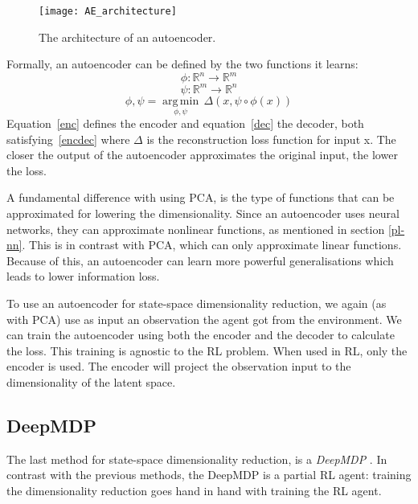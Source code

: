 \begin{figure}[h]
    \centering
    \texttt{[image: AE\_architecture]}
    \caption{The architecture of an autoencoder.}
    \label{fig:AE_architecture}
\end{figure}

Formally, an autoencoder can be defined by the two functions it learns: 
\begin{equation}
  \label{enc}
  \phi :{\mathbb{R}^n}\rightarrow {\mathbb{R}^m}
\end{equation}
\begin{equation}
  \label{dec}
  \psi :{\mathbb{R}^m}\rightarrow {\mathbb{R}^n}
\end{equation}
\begin{equation}
  \label{encdec}
  \phi ,\psi ={\underset {\phi ,\psi }{\operatorname {arg\,min} }}\,{\Delta}(x, \psi \circ \phi (x))
\end{equation}
Equation~\eqref{enc} defines the encoder and equation~\eqref{dec} the decoder, both satisfying~\eqref{encdec} where $\Delta$ is the reconstruction loss function for input x. The closer the output of the autoencoder approximates the original input, the lower the loss.

A fundamental difference with using PCA, is the type of functions that can be approximated for lowering the dimensionality. Since an autoencoder uses neural networks, they can approximate nonlinear functions, as mentioned in section \ref{pl-nn}. This is in contrast with PCA, which can only approximate linear functions. Because of this, an autoencoder can learn more powerful generalisations which leads to lower information loss\cite{AE_general}.

To use an autoencoder for state-space dimensionality reduction, we again (as with PCA) use as input an observation the agent got from the environment. We can train the autoencoder using both the encoder and the decoder to calculate the loss. This training is agnostic to the RL problem. When used in RL, only the encoder is used. The encoder will project the observation input to the dimensionality of the latent space. 

\subsection{DeepMDP}\label{pl-deepmdp}
The last method for state-space dimensionality reduction, is a \emph{DeepMDP} \cite{deepmdp}. In contrast with the previous methods, the DeepMDP is a partial RL agent: training the dimensionality reduction goes hand in hand with training the RL agent.

